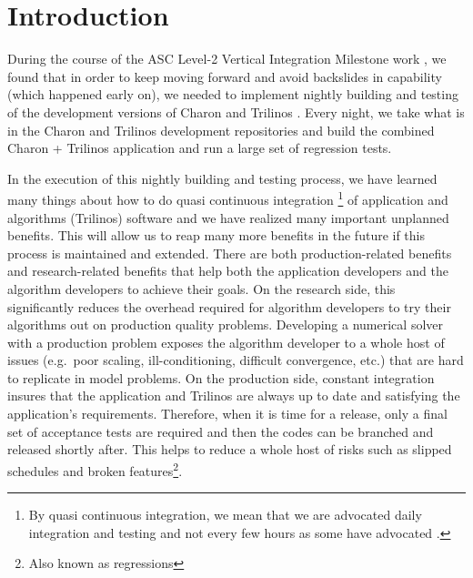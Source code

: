 \documentclass[pdf,ps2pdf,11pt]{SANDreport}
\begin{document}

%

\SANDmain %

%
\section{Introduction}
%

During the course of the ASC Level-2 Vertical Integration Milestone work
{}\cite{ref:asc-vertical-integration-milestone}, we found that in order to
keep moving forward and avoid backslides in capability (which happened early
on), we needed to implement nightly building and testing of the development
versions of Charon and Trilinos {}\cite{ref:trilinos}.  Every night, we take
what is in the Charon and Trilinos development repositories and build the
combined Charon + Trilinos application and run a large set of regression
tests.

In the execution of this nightly building and testing process, we have learned
many things about how to do quasi continuous integration {}\cite[Section
29.4]{book:code-complete-2}\footnote{By quasi continuous integration, we mean
that we are advocated daily integration and testing and not every few hours as
some have advocated {}\cite{continuous-integration}.} of application and
algorithms (Trilinos) software and we have realized many important unplanned
benefits.  This will allow us to reap many more benefits in the future if this
process is maintained and extended.  There are both production-related
benefits and research-related benefits that help both the application
developers and the algorithm developers to achieve their goals.  On the
research side, this significantly reduces the overhead required for algorithm
developers to try their algorithms out on production quality problems.
Developing a numerical solver with a production problem exposes the algorithm
developer to a whole host of issues (e.g.\ poor scaling, ill-conditioning,
difficult convergence, etc.) that are hard to replicate in model problems.  On
the production side, constant integration insures that the application and
Trilinos are always up to date and satisfying the application's requirements.
Therefore, when it is time for a release, only a final set of acceptance tests
are required and then the codes can be branched and released shortly after.
This helps to reduce a whole host of risks such as slipped schedules and
broken features\footnote{Also known as regressions}.
\end{document}
